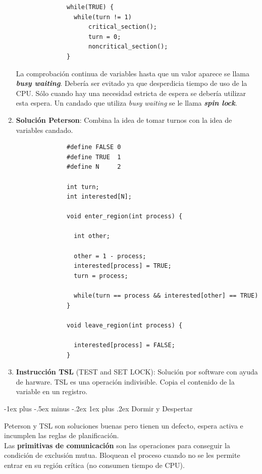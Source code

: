 \documentclass[10pt,portrait, twocolumn]{article}
\makeatletter
\renewcommand{\subsubsection}{\@startsection{subsubsection}{3}{0mm}%
                                {-1ex plus -.5ex minus -.2ex}%
                                {1ex plus .2ex}%
                                {\normalfont\small\bfseries}}
\makeatother
\begin{document}
\begin{enumerate}
			  \begin{verbatim}
			  while(TRUE) {
			  	while(turn != 1)
					critical_section();
					turn = 0;
					noncritical_section();
			  }
			  \end{verbatim}
			  
		La comprobación continua de variables hasta que un valor aparece se llama \textbf{\textit{busy waiting}}. Debería ser evitado ya que desperdicia tiempo de uso de la CPU. Sólo cuando hay una necesidad estricta de espera se debería utilizar esta espera. Un candado que utiliza \textit{busy waiting} se le llama \textbf{\textit{spin lock}}.
			
		\item \textbf{Solución Peterson}: Combina la idea de tomar turnos con la idea de variables candado.
		
		
		\begin{verbatim}
			  #define FALSE 0
			  #define TRUE  1
			  #define N     2
			  
			  int turn;
			  int interested[N];
			  
			  void enter_region(int process) {
			  
			  	int other;
				
				other = 1 - process;
				interested[process] = TRUE;
				turn = process;
				
				while(turn == process && interested[other] == TRUE)
			  }
			  
			  void leave_region(int process) {
			  
			  	interested[process] = FALSE;
			  }
			  \end{verbatim}
		
		\item \textbf{Instrucción TSL} (TEST and SET LOCK): Solución por software con ayuda de harware. TSL es una operación indivisible. Copia el contenido de la variable en un registro.
	\end{enumerate}
	
\subsubsection{Dormir y Despertar}

Peterson y TSL son soluciones buenas pero tienen un defecto, espera activa e incumplen las reglas de planificación.\\

Las \textbf{primitivas de comunicación} son las operaciones para conseguir la condición de exclusión mutua. Bloquean el proceso cuando no se les permite entrar en su región crítica (no consumen tiempo de CPU).
\end{document}
